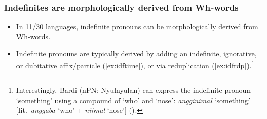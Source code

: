\documentclass{article}
\begin{document}
\subsubsection{Indefinites are morphologically derived from Wh-words}
\begin{itemize}
\item In 11/30 languages, indefinite pronouns can be morphologically derived from Wh-words.
\item Indefinite pronouns are typically derived by adding an indefinite, ignorative, or dubitative affix/particle (\ref{ex:idftime}), or via reduplication (\ref{ex:idfrdp}).\footnote{Interestingly, Bardi (nPN: Nyulnyulan) can express the indefinite pronoun `something' using a compound of `who' and `nose': \textit{angginimal} `something' [lit.\ \textit{anggaba} `who' + \textit{niimal} `nose'] (\citealt[321]{bowern12}).}
\end{itemize}
\end{document}
